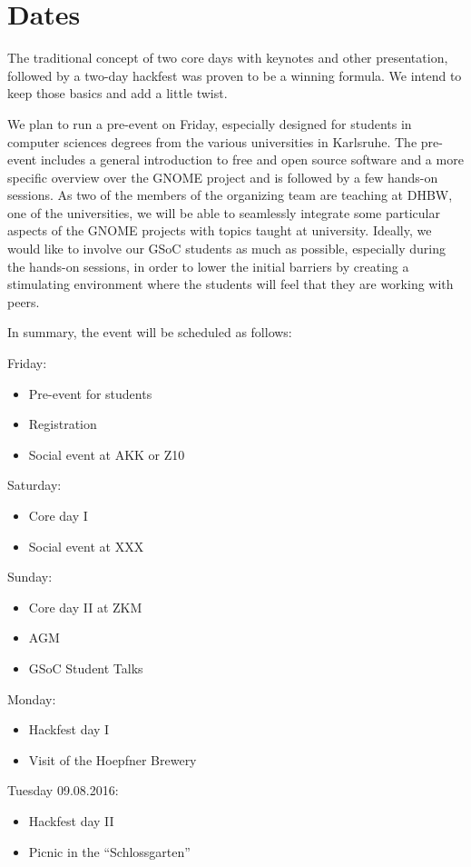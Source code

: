 \section{Dates}

The traditional concept of two core days with keynotes and other 
presentation, followed by a two-day hackfest was proven to be a winning 
formula. We intend to keep those basics and add a little twist.

We plan to run a pre-event on Friday, especially designed for 
students in computer sciences degrees from the various universities in 
Karlsruhe. The pre-event includes a general introduction to free and 
open source software and a more specific overview over the GNOME 
project and is followed by a few hands-on sessions. As two of the 
members of the organizing team are teaching at DHBW, one of the 
universities, we will be able to seamlessly integrate some particular 
aspects of the GNOME projects with topics taught at university. 
Ideally, we would like to involve our GSoC students as much as 
possible, especially during the hands-on sessions, in order to lower 
the initial barriers by creating a stimulating environment where the 
students will feel that they are working with peers.

\iffalse
Furthermore, we plan to host the Sunday lecture session at ZKM, where 
the end of the day can then be spent discovering the incredible variety 
of art exhibitions and challenging each other at various games.
\fi

In summary, the event will be scheduled as follows:

Friday:
\begin{itemize}
\item Pre-event for students
\item Registration
\item Social event at AKK or Z10
\end{itemize}

Saturday:
\begin{itemize}
\item  Core day I
\item  Social event at XXX
\end{itemize}

Sunday:
\begin{itemize}
\item  Core day II at ZKM
\item  AGM
\item  GSoC Student Talks
\end{itemize}

Monday:
\begin{itemize}
\item  Hackfest day I
\item  Visit of the Hoepfner Brewery
\end{itemize}

Tuesday 09.08.2016:
\begin{itemize}
\item  Hackfest day II
\item  Picnic in the “Schlossgarten”
\end{itemize}

